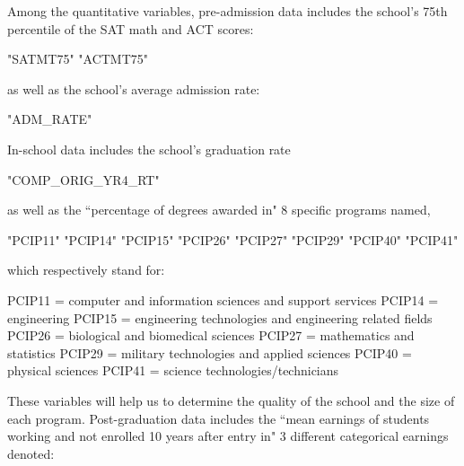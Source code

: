 \documentclass{article}
\begin{document}
Among the quantitative variables, pre-admission data includes the school's 75th percentile of the SAT math and ACT scores:
\begin{Schunk}
\begin{Soutput}
[1] "SATMT75" "ACTMT75"
\end{Soutput}
\end{Schunk}
as well as the school's average admission rate: 
\begin{Schunk}
\begin{Soutput}
[1] "ADM_RATE"
\end{Soutput}
\end{Schunk}
In-school data includes the school's graduation rate 
\begin{Schunk}
\begin{Soutput}
[1] "COMP_ORIG_YR4_RT"
\end{Soutput}
\end{Schunk}
as well as the ``percentage of degrees awarded in" 8 specific programs named, 
\begin{Schunk}
\begin{Soutput}
[1] "PCIP11" "PCIP14" "PCIP15" "PCIP26" "PCIP27" "PCIP29" "PCIP40" "PCIP41"
\end{Soutput}
\end{Schunk}
which respectively stand for:
\begin{center}
\begin{flushleft}
PCIP11 = computer and information sciences and support services \newline
PCIP14 = engineering \newline
PCIP15 = engineering technologies and engineering related fields \newline
PCIP26 = biological and biomedical sciences \newline
PCIP27 = mathematics and statistics \newline
PCIP29 = military technologies and applied sciences \newline
PCIP40 = physical sciences \newline
PCIP41 = science technologies/technicians \newline
\end{flushleft}
\end{center}
  These variables will help us to determine the quality of the school and the size of each program.  Post-graduation data includes the ``mean earnings of students working and not enrolled 10 years after entry in" 3 different categorical earnings denoted:  
\end{document}
